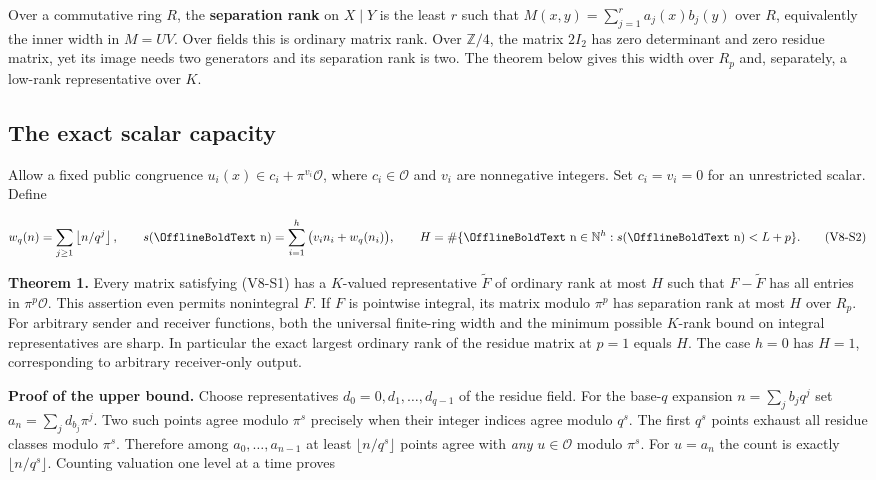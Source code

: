 \documentclass[11pt,a4paper]{article}
\renewcommand{\boldsymbol}[1]{\mathord{\mathchoice
  {\hbox{\OfflineBoldText #1}}{\hbox{\OfflineBoldText #1}}
  {\hbox{\OfflineBoldScript #1}}{\hbox{\OfflineBoldScriptScript #1}}}}
\begin{document}
Over a commutative ring \(R\), the \textbf{separation rank} on
\(X\mid Y\) is the least \(r\) such that
\(M(x,y)=\sum_{j=1}^r a_j(x)b_j(y)\) over \(R\), equivalently the inner
width in \(M=UV\). Over fields this is ordinary matrix rank. Over
\(\mathbb Z/4\), the matrix \(2I_2\) has zero determinant and zero
residue matrix, yet its image needs two generators and its separation
rank is two. The theorem below gives this width over \(R_p\) and,
separately, a low-rank representative over \(K\).

\subsection{The exact scalar capacity}\label{v8-the-exact-scalar-capacity}

Allow a fixed public congruence \(u_i(x)\in c_i+\pi^{v_i}\mathcal O\),
where \(c_i\in\mathcal O\) and \(v_i\) are nonnegative integers. Set
\(c_i=v_i=0\) for an unrestricted scalar. Define

\[
 w_q(n)=\sum_{j\ge1}\left\lfloor n/q^j\right\rfloor,\qquad
 s(\boldsymbol n)=\sum_{i=1}^h\big(v_i n_i+w_q(n_i)\big),\qquad
 H=\#\{\boldsymbol n\in\mathbb N^h:s(\boldsymbol n)<L+p\}.          \tag{V8-S2}
\]

\textbf{Theorem 1.} Every matrix satisfying (V8-S1) has a \(K\)-valued
representative \(\widetilde F\) of ordinary rank at most \(H\) such that
\(F-\widetilde F\) has all entries in \(\pi^p\mathcal O\). This
assertion even permits nonintegral \(F\). If \(F\) is pointwise
integral, its matrix modulo \(\pi^p\) has separation rank at most \(H\)
over \(R_p\). For arbitrary sender and receiver functions, both the
universal finite-ring width and the minimum possible \(K\)-rank bound on
integral representatives are sharp. In particular the exact largest
ordinary rank of the residue matrix at \(p=1\) equals \(H\). The case
\(h=0\) has \(H=1\), corresponding to arbitrary receiver-only output.

\textbf{Proof of the upper bound.} Choose representatives
\(d_0=0,d_1,\ldots,d_{q-1}\) of the residue field. For the base-\(q\)
expansion \(n=\sum_j b_j q^j\) set \(a_n=\sum_j d_{b_j}\pi^j\). Two such
points agree modulo \(\pi^s\) precisely when their integer indices agree
modulo \(q^s\). The first \(q^s\) points exhaust all residue classes
modulo \(\pi^s\). Therefore among \(a_0,\ldots,a_{n-1}\) at least
\(\lfloor n/q^s\rfloor\) points agree with \emph{any} \(u\in\mathcal O\)
modulo \(\pi^s\). For \(u=a_n\) the count is exactly
\(\lfloor n/q^s\rfloor\). Counting valuation one level at a time proves
\end{document}
